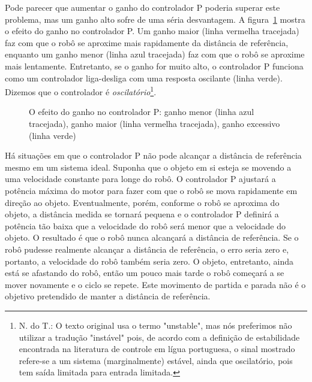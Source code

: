 Pode parecer que aumentar o ganho do controlador P poderia superar este problema, mas um ganho alto sofre de uma séria desvantagem. A figura~\ref{fig.gain} mostra o efeito do ganho no controlador P. Um ganho maior (linha vermelha tracejada) faz com que o robô se aproxime mais rapidamente da distância de referência, enquanto um ganho menor (linha azul tracejada) faz com que o robô se aproxime mais lentamente. Entretanto, se o ganho for muito alto, o controlador P funciona como um controlador liga-desliga com uma resposta oscilante (linha verde). Dizemos que o controlador é \emph{oscilatório}\footnote{N. do T.: O texto original usa o termo "unstable", mas nós preferimos não utilizar a tradução "instável" pois, de acordo com a definição de estabilidade encontrada na literatura de controle em lígua portuguesa, o sinal mostrado refere-se a um sistema (marginalmente) estável, ainda que oscilatório, pois tem saída limitada para entrada limitada.}.


\begin{figure}
\begin{center}
\caption{O efeito do ganho no controlador P: ganho menor (linha azul tracejada), ganho maior (linha vermelha tracejada), ganho excessivo (linha verde)}\label{fig.gain}
\end{center}
\end{figure}

Há situações em que o controlador P não pode alcançar a distância de referência mesmo em um sistema ideal. Suponha que o objeto em si esteja se movendo a uma velocidade constante para longe do robô. O controlador P ajustará a potência máxima do motor para fazer com que o robô se mova rapidamente em direção ao objeto. Eventualmente, porém, conforme o robô se aproxima do objeto, a distância medida se tornará pequena e o controlador P definirá a potência tão baixa que a velocidade do robô será menor que a velocidade do objeto. O resultado é que o robô nunca alcançará a distância de referência. Se o robô pudesse realmente alcançar a distância de referência, o erro seria zero e, portanto, a velocidade do robô também seria zero. O objeto, entretanto, ainda está se afastando do robô, então um pouco mais tarde o robô começará a se mover novamente e o ciclo se repete. Este movimento de partida e parada não é o objetivo pretendido de manter a distância de referência.

